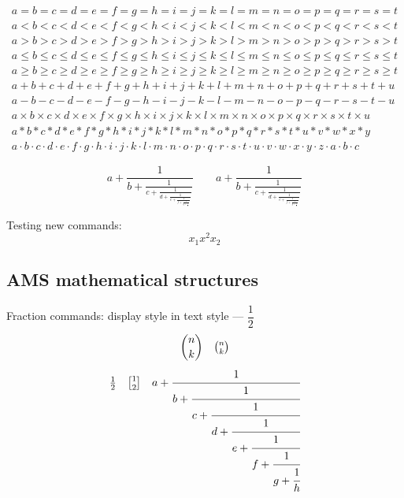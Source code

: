 \documentclass[12pt,a4paper]{article}
\theoremstyle{clearprint}
\newcommand{\xsb}{x_{1}}
\newcommand{\xsp}{x^{2}}
\newcommand{\xsbnum}[1]{x_{#1}}
\begin{document}
\noindent
\begin{eqnarray*}
a = b = c = d = e = f = g = h = i = j = k = l = m = n = o = p = q = r = s = t\\
a < b < c < d < e < f < g < h < i < j < k < l < m < n < o < p < q < r < s < t\\
a > b > c > d > e > f > g > h > i > j > k > l > m > n > o > p > q > r > s > t\\
a \leq b \leq c \leq d \leq e \leq f \leq g \leq h \leq i \leq j \leq k \leq l \leq m \leq n \leq o \leq p \leq q \leq r \leq s \leq t\\
a \geq b \geq c \geq d \geq e \geq f \geq g \geq h \geq i \geq j \geq k \geq l \geq m \geq n \geq o \geq p \geq q \geq r \geq s \geq t\\
a + b + c + d + e + f + g + h + i + j + k + l + m + n + o + p + q + r + s + t + u\\
a - b - c - d - e - f - g - h - i - j - k - l - m - n - o - p - q - r - s - t - u\\
a \times b \times c \times d \times e \times f \times g \times h \times i \times j \times k \times l \times m \times n \times o \times p \times q \times r \times s \times t \times u\\
a * b * c * d * e * f * g * h * i * j * k * l * m * n * o * p * q * r * s * t * u * v * w * x * y\\
a \cdot b \cdot c \cdot d \cdot e \cdot f \cdot g \cdot h \cdot i \cdot j \cdot k \cdot l \cdot m \cdot n \cdot o \cdot p \cdot q \cdot r \cdot s \cdot t \cdot u \cdot v \cdot w \cdot x \cdot y \cdot z \cdot a \cdot b \cdot c
\end{eqnarray*}


\noindent
\[
{a + \frac{1}{b + \frac{1}{c + \frac{1}{d + \frac{1}{e + \frac{1}{f + \frac{1}{g + \frac{1}{h}}}}}}}} \qquad {a + \frac{1}{\displaystyle b + \frac{1}{\displaystyle c + \frac{1}{\displaystyle d + \frac{1}{\displaystyle e + \frac{1}{\displaystyle f + \frac{1}{\displaystyle g + \frac{1}{h}}}}}}}}
\]

\noindent
Testing new commands:
\[ 
\xsb \xsp \xsbnum{2}
\]


\subsection[AMS maths structures]{AMS mathematical structures}
\setcounter{equation}{0}

\noindent
Fraction commands: display style in text style --- $\dfrac{1}{2}$
\newcommand{\testfrac}[2]{\genfrac{[}{]}{0pt}{1}{#1}{#2}}
\begin{equation}
\binom{n}{k} \quad \tbinom{n}{k} 
\end{equation}
\begin{equation}
\tfrac{1}{2} \quad \testfrac{1}{2} \quad  
a + \cfrac{1}{b + \cfrac{1}{c + \cfrac{1}{d + \cfrac{1}{e + \cfrac{1}{f + \cfrac{1}{g + \cfrac{1}{h}}}}}}}
\end{equation}
\end{document}
